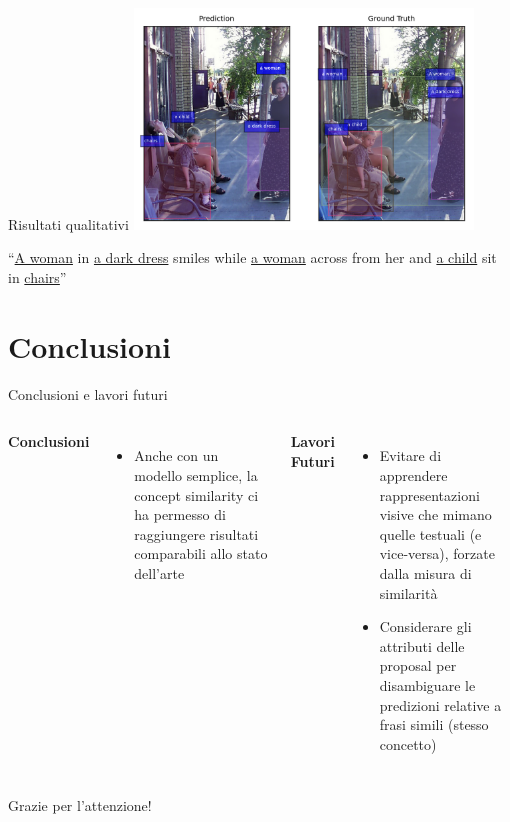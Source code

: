 \documentclass{beamer}
\begin{document}
\begin{frame}{Risultati qualitativi}
  \centering
  \includegraphics[width=9cm]{images/similing-woman.png}
  
  ``\underline{A woman} in \underline{a dark dress} smiles while
  \underline{a woman} across from her and \underline{a child} sit in
  \underline{chairs}''
\end{frame}

\section{Conclusioni}

\begin{frame}{Conclusioni e lavori futuri}
  \begin{columns}
      \textbf{Conclusioni}
      \begin{itemize}
        \item Anche con un \alert{modello semplice}, la concept
        similarity ci ha permesso di raggiungere \alert{risultati
        comparabili} allo stato dell'arte
      \end{itemize}
      \textbf{Lavori Futuri}
      \begin{itemize}
        \item \alert{Evitare} di apprendere \alert{rappresentazioni
        visive che mimano quelle testuali} (e vice-versa), forzate
        dalla misura di similarità
        \item Considerare gli \alert{attributi} delle proposal per
        \alert{disambiguare le predizioni} relative a frasi simili
        (stesso concetto)
      \end{itemize}
  \end{columns}
\end{frame}

\begin{frame}
  \centering
  \huge
  Grazie per l'attenzione!
\end{frame}
\end{document}

